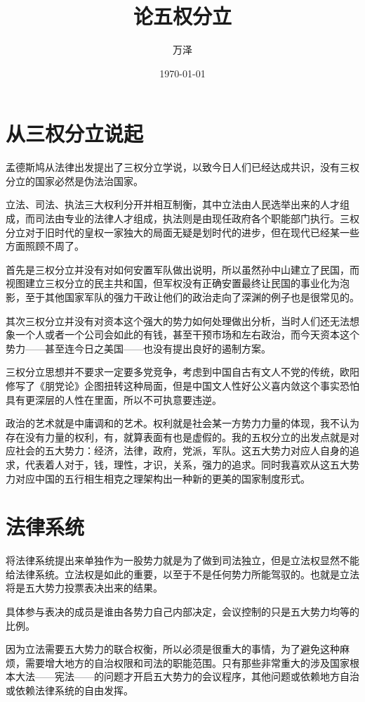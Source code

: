 \documentclass[11pt,oneside]{article}
\author{万泽}
\date{\today}
\title{论五权分立}
\begin{document}
\maketitle
\tableofcontents



\section{从三权分立说起}
\label{sec-1}
孟德斯鸠从法律出发提出了三权分立学说，以致今日人们已经达成共识，没有三权分立的国家必然是伪法治国家。

立法、司法、执法三大权利分开并相互制衡，其中立法由人民选举出来的人才组成，而司法由专业的法律人才组成，执法则是由现任政府各个职能部门执行。三权分立对于旧时代的皇权一家独大的局面无疑是划时代的进步，但在现代已经某一些方面照顾不周了。

首先是三权分立并没有对如何安置军队做出说明，所以虽然孙中山建立了民国，而视图建立三权分立的民主共和国，但军权没有正确安置最终让民国的事业化为泡影，至于其他国家军队的强力干政让他们的政治走向了深渊的例子也是很常见的。

其次三权分立并没有对资本这个强大的势力如何处理做出分析，当时人们还无法想象一个人或者一个公司会如此的有钱，甚至干预市场和左右政治，而今天资本这个势力——甚至连今日之美国——也没有提出良好的遏制方案。

三权分立思想并不要求一定要多党竞争，考虑到中国自古有文人不党的传统，欧阳修写了《朋党论》企图扭转这种局面，但是中国文人性好公义喜内敛这个事实恐怕具有更深层的人性在里面，所以不可执意要违逆。

政治的艺术就是中庸调和的艺术。权利就是社会某一方势力力量的体现，我不认为存在没有力量的权利，有，就算表面有也是虚假的。我的五权分立的出发点就是对应社会的五大势力：经济，法律，政府，党派，军队。这五大势力对应人自身的追求，代表着人对于，钱，理性，才识，关系，强力的追求。同时我喜欢从这五大势力对应中国的五行相生相克之理架构出一种新的更美的国家制度形式。


\section{法律系统}
\label{sec-2}
将法律系统提出来单独作为一股势力就是为了做到司法独立，但是立法权显然不能给法律系统。立法权是如此的重要，以至于不是任何势力所能驾驭的。也就是立法将是五大势力投票表决出来的结果。

具体参与表决的成员是谁由各势力自己内部决定，会议控制的只是五大势力均等的比例。

因为立法需要五大势力的联合权衡，所以必须是很重大的事情，为了避免这种麻烦，需要增大地方的自治权限和司法的职能范围。只有那些非常重大的涉及国家根本大法——宪法——的问题才开启五大势力的会议程序，其他问题或依赖地方自治或依赖法律系统的自由发挥。
\end{document}
